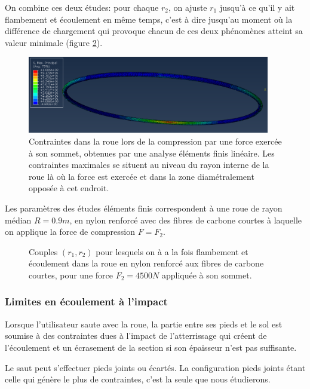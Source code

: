 On combine ces deux études: pour chaque $r_2$, on ajuste $r_1$ jusqu'à ce qu'il y ait flambement et écoulement en même temps, c'est à dire jusqu'au moment où la différence de chargement qui provoque chacun de ces deux phénomènes atteint sa valeur minimale (figure \ref{fig:fle12}). 
 \begin{figure}[h]
\centering
\includegraphics[width=400]{saut2/elf3.PNG}
\caption{Contraintes dans la roue lors de la compression par une force exercée à son sommet, obtenues par une analyse éléments finis linéaire. Les contraintes maximales se situent au niveau du rayon interne de la roue là où la force est exercée et dans la zone diamétralement opposée à cet endroit.}
\label{fig:elf2}
\end{figure}

Les paramètres des études éléments finis correspondent à une roue de rayon médian $R=0.9 m$, en nylon renforcé avec des fibres de carbone courtes à laquelle on applique la force de compression $F=F_2$.

\begin{figure}[h]
\def\svgwidth{240}

\def\svgwidth{240}

\caption{Couples $(r_1,r_2)$ pour lesquels on à a la fois flambement et écoulement dans la roue en nylon renforcé aux fibres de carbone courtes, pour une force $F_2=4500 N$ appliquée à son sommet.}
\label{fig:fle12}
\end{figure}

\subsubsection{Limites en écoulement à l'impact}

Lorsque l'utilisateur saute avec la roue, la partie entre ses pieds et le sol est soumise à des contraintes dues à l'impact de l'atterrissage qui créent de l'écoulement et un écrasement de la section si son épaisseur n'est pas suffisante. 

Le saut peut s'effectuer pieds joints ou écartés. La configuration pieds joints étant celle qui génère le plus de contraintes, c'est la seule que nous étudierons.

